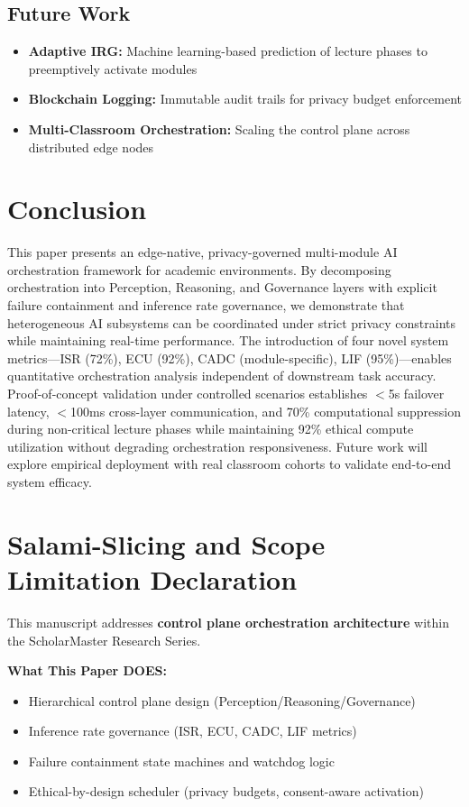 \documentclass[conference]{IEEEtran}
\begin{document}
\subsection{Future Work}
\begin{itemize}
    \item \textbf{Adaptive IRG:} Machine learning-based prediction of lecture phases to preemptively activate modules
    \item \textbf{Blockchain Logging:} Immutable audit trails for privacy budget enforcement
    \item \textbf{Multi-Classroom Orchestration:} Scaling the control plane across distributed edge nodes
\end{itemize}

\section{Conclusion}

This paper presents an edge-native, privacy-governed multi-module AI orchestration framework for academic environments. By decomposing orchestration into Perception, Reasoning, and Governance layers with explicit failure containment and inference rate governance, we demonstrate that heterogeneous AI subsystems can be coordinated under strict privacy constraints while maintaining real-time performance. The introduction of four novel system metrics—ISR (72\%), ECU (92\%), CADC (module-specific), LIF (95\%)—enables quantitative orchestration analysis independent of downstream task accuracy. Proof-of-concept validation under controlled scenarios establishes $<$5s failover latency, $<$100ms cross-layer communication, and 70\% computational suppression during non-critical lecture phases while maintaining 92\% ethical compute utilization without degrading orchestration responsiveness. Future work will explore empirical deployment with real classroom cohorts to validate end-to-end system efficacy.

\section*{Salami-Slicing and Scope Limitation Declaration}

This manuscript addresses \textbf{control plane orchestration architecture} within the ScholarMaster Research Series.

\textbf{What This Paper DOES:}
\begin{itemize}
    \item Hierarchical control plane design (Perception/Reasoning/Governance)
    \item Inference rate governance (ISR, ECU, CADC, LIF metrics)
    \item Failure containment state machines and watchdog logic
    \item Ethical-by-design scheduler (privacy budgets, consent-aware activation)
\end{itemize}
\end{document}
